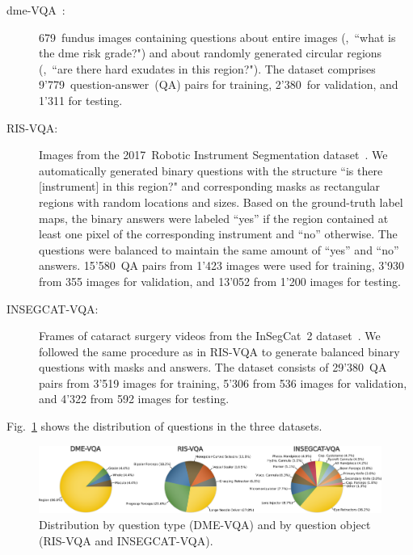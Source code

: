 \begin{description}
    \item[\gls{dme}-VQA~\cite{tascon2022consistency}:] 679~fundus images containing questions about entire images (\eg,~``what is the \gls{dme} risk grade?") and about randomly generated circular regions (\eg,~``are there hard exudates in this region?"). The dataset comprises 9'779~question-answer~(QA) pairs for training, 2'380~for validation, and 1'311 for testing.
    \item[RIS-VQA:] Images from the 2017~Robotic Instrument Segmentation dataset~\cite{allan20192017}. We automatically generated binary questions with the structure ``is there [instrument] in this region?" and corresponding masks as rectangular regions with random locations and sizes. Based on the ground-truth label maps, the binary answers were labeled ``yes'' if the region contained at least one pixel of the corresponding instrument and ``no'' otherwise. The questions were balanced to maintain the same amount of ``yes'' and ``no'' answers. 15'580~QA pairs from 1'423 images were used for training, 3'930 from 355 images for validation, and 13'052 from 1'200 images for testing.
    \item[INSEGCAT-VQA:] Frames of cataract surgery videos from the InSegCat~2 dataset~\cite{fox2020insegcat}. We followed the same procedure as in RIS-VQA to generate balanced binary questions with masks and answers.
    The dataset consists of 29'380~QA pairs from 3'519 images for training, 5'306 from 536 images for validation, and 4'322 from 592 images for testing. %
\end{description}
Fig.~\ref{fig:object_distribution} shows the distribution of questions in the three datasets.

\begin{figure}[t]
\begin{center}
\includegraphics[width=\textwidth]{Figures/Part1_LocVQA/01_locatt/pie_charts_data.pdf}
\caption{Distribution by question type (DME-VQA) and by question object (RIS-VQA and INSEGCAT-VQA).}
\label{fig:object_distribution}
\end{center}
\end{figure}

